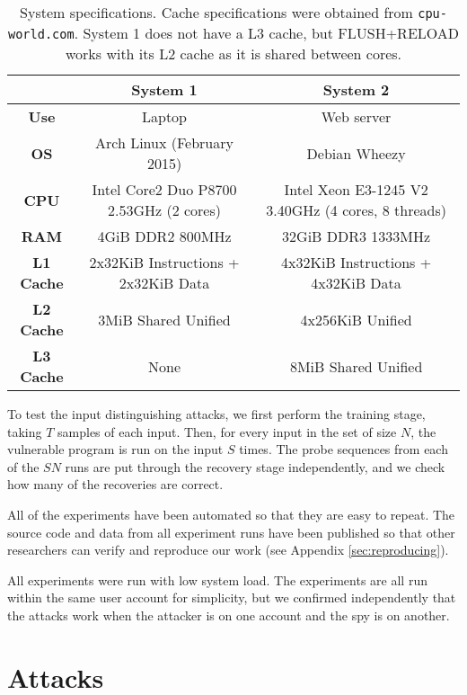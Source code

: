 \documentclass[letterpaper,twocolumn,10pt]{article}
\begin{document}
\begin{table*}
    \centering
\begin{tabular}{|c|c|c|}
    \hline
    & \textbf{System 1} & \textbf{System 2} \\
    \hline
    \textbf{Use} & Laptop & Web server \\
    \hline
    \textbf{OS} & Arch Linux (February 2015) & Debian Wheezy \\
    \hline
    \textbf{CPU} & Intel Core2 Duo P8700 2.53GHz (2 cores) & Intel Xeon E3-1245 V2 3.40GHz (4 cores, 8 threads)  \\
    \hline
    \textbf{RAM} & 4GiB DDR2 800MHz & 32GiB DDR3 1333MHz \\
    \hline
    \textbf{L1 Cache} & 2x32KiB Instructions + 2x32KiB Data & 4x32KiB Instructions + 4x32KiB Data \\
    \hline
    \textbf{L2 Cache} & 3MiB Shared Unified & 4x256KiB Unified \\
    \hline
    \textbf{L3 Cache} & None & 8MiB Shared Unified \\
    \hline
\end{tabular}
\caption{System specifications. Cache specifications were obtained from
    \texttt{cpu-world.com}. System 1 does not have a L3
cache, but FLUSH+RELOAD works with its L2 cache as it is shared between cores.}
\label{table:specs}
\end{table*}

To test the input distinguishing attacks, we first perform the training stage,
taking $T$ samples of each input. Then, for every input in the set of size $N$,
the vulnerable program is run on the input $S$ times. The probe sequences from
each of the $SN$ runs are put through the recovery stage independently, and we
check how many of the recoveries are correct.

All of the experiments have been automated so that they are easy to repeat. The
source code and data from all experiment runs have been published so that other
researchers can verify and reproduce our work (see Appendix
\ref{sec:reproducing}).

All experiments were run with low system load. The experiments are all run
within the same user account for simplicity, but we confirmed independently that
the attacks work when the attacker is on one account and the spy is on another.

\section{Attacks}
\label{sec:results}
\end{document}
